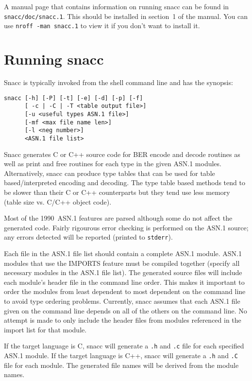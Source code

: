 A manual page that contains information on running snacc can be found in
\verb$snacc/doc/snacc.1$.  This should be installed in section~1 of
the manual.  You can use \verb$nroff -man snacc.1$ to view it if you
don't want to install it.


\section{\label{old-run-section}Running snacc}

Snacc is typically invoked from the shell command line and has the synopsis:
\begin{verbatim}
snacc [-h] [-P] [-t] [-e] [-d] [-p] [-f]
      [ -c | -C | -T <table output file>]
      [-u <useful types ASN.1 file>]
      [-mf <max file name len>]
      [-l <neg number>]
      <ASN.1 file list>
\end{verbatim}

Snacc generates C or C++ source code for BER encode and decode
routines as well as print and free routines for each type in the given
ASN.1 modules.  Alternatively, snacc can produce type tables that can
be used for table based/interpreted encoding and decoding.  The type
table based methods tend to be slower than their C or C++ counterparts
but they tend use less memory (table size vs. C/C++ object code).

Most of the 1990~ASN.1 features are parsed although some do not affect
the generated code.  Fairly rigourous error checking is performed on
the ASN.1 source; any errors detected will be reported (printed to
\verb$stderr$).

Each file in the ASN.1 file list should contain a complete ASN.1
module.  ASN.1 modules that use the IMPORTS feature must be compiled
together (specify all necessary modules in the ASN.1 file list).  The
generated source files will include each module's header file in the
command line order.  This makes it important to order the modules from
least dependent to most dependent on the command line to avoid type
ordering problems. Currently, snacc assumes that each ASN.1 file
given on the command line depends on all of the others on the command
line.  No attempt is made to only include the header files from
modules referenced in the import list for that module.

If the target language is C, snacc will generate a \verb$.h$ and
\verb$.c$ file for each specified ASN.1 module.  If the target
language is C++, snacc will generate a \verb$.h$ and \verb$.C$ file
for each module.  The generated file names will be derived from the
module names.

